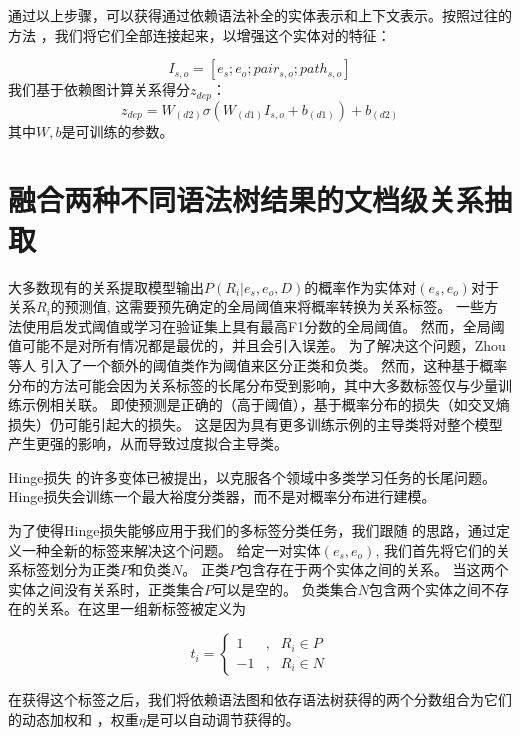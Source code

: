 \documentclass[bachelor]{thesis-uestc}
\begin{document}
通过以上步骤，可以获得通过依赖语法补全的实体表示和上下文表示。按照过往的方法 \cite{mou-etal-2016-natural}，我们将它们全部连接起来，以增强这个实体对的特征：

\begin{equation}
    I_{s,o} = [e_s;e_o;pair_{s,o};path_{s,o}]
\end{equation}
我们基于依赖图计算关系得分$z_{dep}$：
\begin{equation}
    z_{dep} = W_{(d2)} \sigma (W_{(d1)}I_{s,o} + b_{(d1)}) + b_{(d2)}
\end{equation}
其中$W, b$是可训练的参数。\par

\section{融合两种不同语法树结果的文档级关系抽取}
大多数现有的关系提取模型输出$P(R_i|e_s, e_o, D)$的概率作为实体对$(e_s, e_o)$对于关系$R_i$的预测值, 这需要预先确定的全局阈值来将概率转换为关系标签。
一些方法使用启发式阈值或学习在验证集上具有最高F1分数的全局阈值。
然而，全局阈值可能不是对所有情况都是最优的，并且会引入误差。
为了解决这个问题，Zhou等人 \cite{Zhao2022DocumentlevelRE}引入了一个额外的阈值类作为阈值来区分正类和负类。
然而，这种基于概率分布的方法可能会因为关系标签的长尾分布受到影响，其中大多数标签仅与少量训练示例相关联。
即使预测是正确的（高于阈值），基于概率分布的损失（如交叉熵损失）仍可能引起大的损失。
这是因为具有更多训练示例的主导类将对整个模型产生更强的影响，从而导致过度拟合主导类。\par
Hinge损失 \cite{Gentile1998LinearHL} 的许多变体已被提出，以克服各个领域中多类学习任务的长尾问题。
Hinge损失会训练一个最大裕度分类器，而不是对概率分布进行建模。
\par

为了使得Hinge损失能够应用于我们的多标签分类任务，我们跟随 \cite{SagDRE} 的思路，通过定义一种全新的标签来解决这个问题。
给定一对实体$(e_s, e_o)$, 我们首先将它们的关系标签划分为正类$P$和负类$N$。
正类$P$包含存在于两个实体之间的关系。
当这两个实体之间没有关系时，正类集合$P$可以是空的。
负类集合$N$包含两个实体之间不存在的关系。在这里一组新标签被定义为

\begin{equation}
    t_i = \left\{
	\begin{aligned}
		1 & , & R_i \in P \\
        -1 & , & R_i \in N
    \end{aligned}
	\right.
\end{equation}\par
在获得这个标签之后，我们将依赖语法图和依存语法树获得的两个分数组合为它们的动态加权和 \cite{kendall2018multi}，权重$\eta$是可以自动调节获得的。
\end{document}
